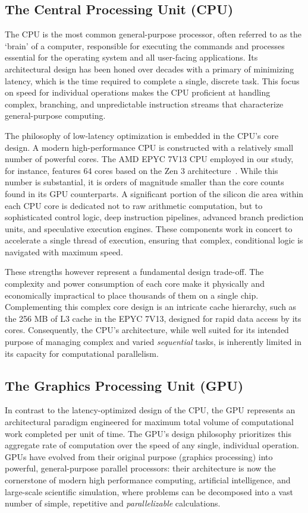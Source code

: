 \documentclass[twoside,12pt,openright]{report}  %
\begin{document}
\subsection{The Central Processing Unit (CPU)}
The CPU is the most common general-purpose processor, often referred to as the `brain' of a computer, responsible for executing the commands and processes essential for the operating system and all user-facing applications. Its architectural design has been honed over decades with a primary of minimizing latency, which is the time required to complete a single, discrete task. This focus on speed for individual operations makes the CPU proficient at handling complex, branching, and unpredictable instruction streams that characterize general-purpose computing.

The philosophy of low-latency optimization is embedded in the CPU's core design. A modern high-performance CPU is constructed with a relatively small number of powerful cores. The AMD EPYC 7V13 CPU employed in our study, for instance, features 64 cores based on the Zen 3 architecture~\cite{amd:epyc7003}. While this number is substantial, it is orders of magnitude smaller than the core counts found in its GPU counterparts. A significant portion of the silicon die area within each CPU core is dedicated not to raw arithmetic computation, but to sophisticated control logic, deep instruction pipelines, advanced branch prediction units, and speculative execution engines. These components work in concert to accelerate a single thread of execution, ensuring that complex, conditional logic is navigated with maximum speed.

These strengths however represent a fundamental design trade-off. The complexity and power consumption of each core make it physically and economically impractical to place thousands of them on a single chip. Complementing this complex core design is an intricate cache hierarchy, such as the 256 MB of L3 cache in the EPYC 7V13, designed for rapid data access by its cores. Consequently, the CPU's architecture, while well suited for its intended purpose of managing complex and varied \textit{sequential} tasks, is inherently limited in its capacity for computational parallelism. 

\subsection{The Graphics Processing Unit (GPU)}
In contrast to the latency-optimized design of the CPU, the GPU represents an architectural paradigm engineered for maximum total volume of computational work completed per unit of time. The GPU's design philosophy prioritizes this aggregate rate of computation over the speed of any single, individual operation. GPUs have evolved from their original purpose (graphics processing) into powerful, general-purpose parallel processors: their architecture is now the cornerstone of modern high performance computing, artificial intelligence, and large-scale scientific simulation, where problems can be decomposed into a vast number of simple, repetitive and \textit{parallelizable} calculations.
\end{document}
